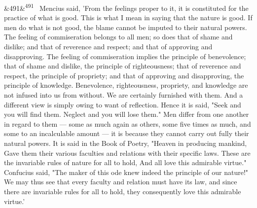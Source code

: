 \documentclass[12pt]{article}
\newcommand{\para}[1][]{\par\noindent\ifx&#1&\else\textsuperscript{\footnotesize #1}~\fi}
\begin{document}
\para[491] Mencius said, 'From the feelings proper to it, it is constituted for the practice of what is good. This is what I mean in saying that the nature is good. If men do what is not good, the blame cannot be imputed to their natural powers. The feeling of commiseration belongs to all men; so does that of shame and dislike; and that of reverence and respect; and that of approving and disapproving. The feeling of commiseration implies the principle of benevolence; that of shame and dislike, the principle of righteousness; that of reverence and respect, the principle of propriety; and that of approving and disapproving, the principle of knowledge. Benevolence, righteousness, propriety, and knowledge are not infused into us from without. We are certainly furnished with them. And a different view is simply owing to want of reflection. Hence it is said, "Seek and you will find them. Neglect and you will lose them." Men differ from one another in regard to them --- some as much again as others, some five times as much, and some to an incalculable amount --- it is because they cannot carry out fully their natural powers. It is said in the Book of Poetry, "Heaven in producing mankind, Gave them their various faculties and relations with their specific laws. These are the invariable rules of nature for all to hold, And all love this admirable virtue." Confucius said, "The maker of this ode knew indeed the principle of our nature!" We may thus see that every faculty and relation must have its law, and since there are invariable rules for all to hold, they consequently love this admirable virtue.'
\end{document}
